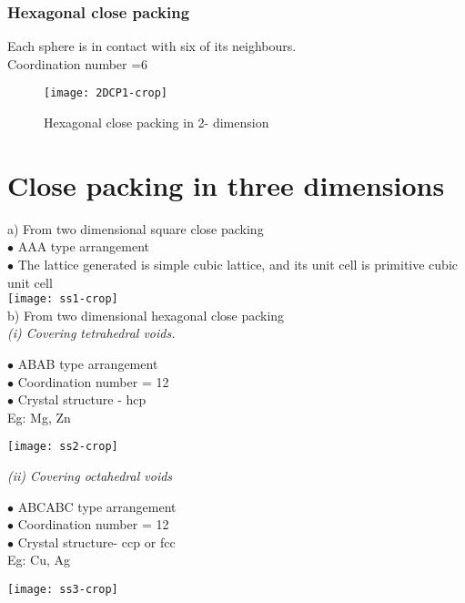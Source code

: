 \subsubsection{Hexagonal close packing }
Each sphere is in contact with six of its neighbours.\\
Coordination number =6
\begin{figure}[H]
	\centering
	\texttt{[image: 2DCP1-crop]}
	\caption{Hexagonal close packing in 2- dimension}
	\label{}
\end{figure}

\section{Close packing in three dimensions}
a)	From two dimensional square close packing\\
$\bullet$ AAA type arrangement\\
$\bullet$	The lattice generated is simple cubic lattice, and its unit cell is primitive cubic unit cell\\
\texttt{[image: ss1-crop]}\\
b)	From two dimensional hexagonal close packing \\
\textit{(i) Covering tetrahedral voids.}\\
\begin{minipage}{0.45\textwidth}
	$\bullet$	ABAB type arrangement\\
	$\bullet$ Coordination number = 12\\
	$\bullet$ Crystal structure - hcp\\
	Eg: Mg, Zn
\end{minipage}
\begin{minipage}{0.45\textwidth}
	\texttt{[image: ss2-crop]}	
\end{minipage}
\newline
\textit{(ii) Covering octahedral voids}\\
\begin{minipage}{0.45\textwidth}
	$\bullet$ ABCABC type arrangement\\
	$\bullet$ Coordination number = 12\\
	$\bullet$ Crystal structure- ccp or fcc\\
	Eg: Cu, Ag
\end{minipage}
\begin{minipage}{0.45\textwidth}
	\texttt{[image: ss3-crop]}	
\end{minipage}\\
